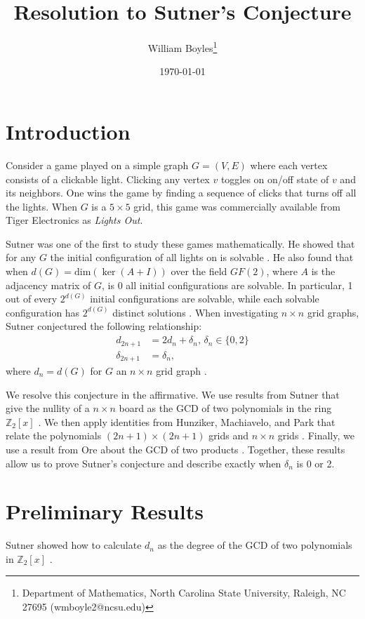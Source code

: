 \documentclass[a4paper]{article}
\newcommand{\Z}{\mathbb{Z}}
\renewcommand{\dim}[1]{\text{dim}\left( #1 \right)}
\begin{document}
	\title{Resolution to Sutner's Conjecture}
	\author{William Boyles\thanks{Department of Mathematics, North Carolina State University, Raleigh, NC 27695 (wmboyle2@ncsu.edu)}}
	\date{\today}
	\maketitle
	
	\section{Introduction}
	Consider a game played on a simple graph $G = (V,E)$ where each vertex consists of a clickable light.
	Clicking any vertex $v$ toggles on on/off state of $v$ and its neighbors.
	One wins the game by finding a sequence of clicks that turns off all the lights.
	When $G$ is a $5 \times 5$ grid, this game was commercially available from Tiger Electronics as \textit{Lights Out}.
	
	Sutner was one of the first to study these games mathematically.
	He showed that for any $G$ the initial configuration of all lights on is solvable \cite{Sutner1989}.
	He also found that when $d(G) = \dim{\ker{(A + I)}}$ over the field $GF(2)$, where $A$ is the adjacency matrix of $G$, is 0 all initial configurations are solvable.
	In particular, 1 out of every $2^{d(G)}$ initial configurations are solvable, while each solvable configuration has $2^{d(G)}$ distinct solutions \cite{Sutner1989}.
	When investigating $n \times n$ grid graphs, Sutner conjectured the following relationship:
	\begin{align*}
		d_{2n+1} &= 2d_n + \delta_n \text{, } \delta_n \in \{0,2\} \\
		\delta_{2n+1} &= \delta_n,
	\end{align*}
	where $d_n = d(G)$ for $G$ an $n \times n$ grid graph \cite{Sutner1989}.
	
	We resolve this conjecture in the affirmative.
	We use results from Sutner that give the nullity of a $n \times n$ board as the GCD of two polynomials in the ring $\Z_2[x]$ \cite{Sutner96sigma-automataand}.
	We then apply identities from Hunziker, Machiavelo, and Park that relate the polynomials $(2n+1) \times (2n+1)$ grids and $n \times n$ grids \cite{HUNZIKER2004465}.
	Finally, we use a result from Ore about the GCD of two products \cite{ore_number_theory}.
	Together, these results allow us to prove Sutner's conjecture and describe exactly when $\delta_n$ is 0 or 2.
	
	\section{Preliminary Results}
	Sutner showed how to calculate $d_n$ as the degree of the GCD of two polynomials in $\Z_2[x]$ \cite{Sutner96sigma-automataand}.
	
\end{document}
